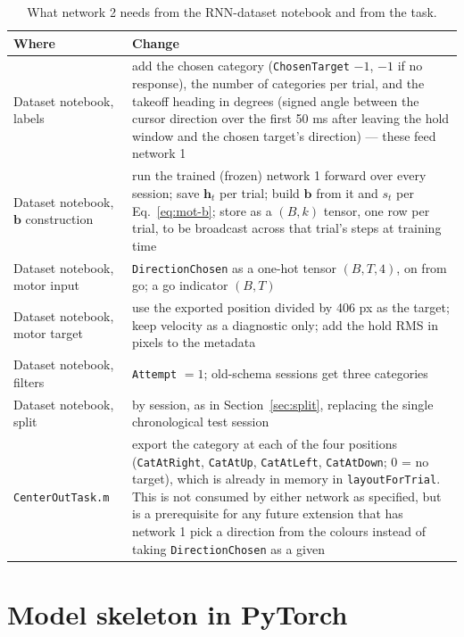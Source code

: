 \documentclass[11pt,a4paper]{article}
\newcommand{\vect}[1]{\bm{#1}}
\begin{document}
\begin{table}[H]
  \centering\small
  \caption{What network 2 needs from the RNN-dataset notebook and from the task.}
  \begin{tabular}{p{4cm}p{11cm}}
    \toprule
    Where & Change \\
    \midrule
    Dataset notebook, labels & add the chosen category (\texttt{ChosenTarget} $- 1$, $-1$ if no response), the number of categories per trial, and the takeoff heading in degrees (signed angle between the cursor direction over the first 50 ms after leaving the hold window and the chosen target's direction) — these feed network 1 \\
    Dataset notebook, $\vect{b}$ construction & run the trained (frozen) network 1 forward over every session; save $\vect{h}_t$ per trial; build $\vect{b}$ from it and $s_t$ per Eq.~\eqref{eq:mot-b}; store as a $(B, k)$ tensor, one row per trial, to be broadcast across that trial's steps at training time \\
    Dataset notebook, motor input & \texttt{DirectionChosen} as a one-hot tensor $(B, T, 4)$, on from go; a go indicator $(B, T)$ \\
    Dataset notebook, motor target & use the exported position divided by 406 px as the target; keep velocity as a diagnostic only; add the hold RMS in pixels to the metadata \\
    Dataset notebook, filters & \texttt{Attempt} $= 1$; old-schema sessions get three categories \\
    Dataset notebook, split & by session, as in Section~\ref{sec:split}, replacing the single chronological test session \\
    \texttt{CenterOutTask.m} & export the category at each of the four positions (\texttt{CatAtRight}, \texttt{CatAtUp}, \texttt{CatAtLeft}, \texttt{CatAtDown}; 0 = no target), which is already in memory in \texttt{layoutForTrial}. This is not consumed by either network as specified, but is a prerequisite for any future extension that has network 1 pick a direction from the colours instead of taking \texttt{DirectionChosen} as a given \\
    \bottomrule
  \end{tabular}
\end{table}

\clearpage
\appendix
\section{Model skeleton in PyTorch}
\end{document}
